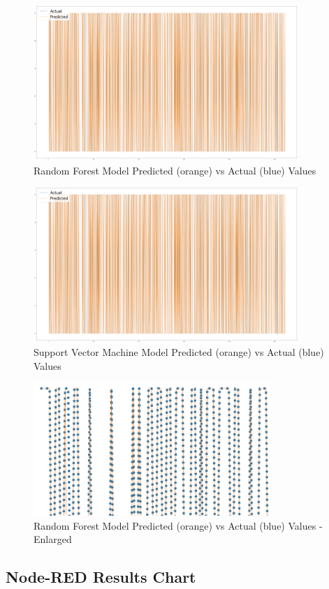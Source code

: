 \documentclass{article}
\begin{document}
\begin{figure}[h!]
	\centering
	\includegraphics[width=10cm]{assets/svm-diagram-predicted-vs-actual-total.png}
	\caption{Random Forest Model Predicted (orange) vs Actual (blue) Values}
	\label{fig::rf-predicted-vs-actual-total}
\end{figure}

\begin{figure}[h!]
	\centering
	\includegraphics[width=10cm]{assets/svm-diagram-predicted-vs-actual-total.png}
	\caption{Support Vector Machine Model Predicted (orange) vs Actual (blue) Values}
	\label{fig::svm-predicted-vs-actual-total}
\end{figure}

\begin{figure}[h!]
	\centering
	\includegraphics[width=9cm]{assets/rf-predicted-vs-actual-enlarged.png}
	\caption{Random Forest Model Predicted (orange) vs Actual (blue) Values - Enlarged}
	\label{fig::rf-predicted-vs-actual-enlarged}
\end{figure}

\subsection[]{Node-RED Results Chart}


 
\end{document}
